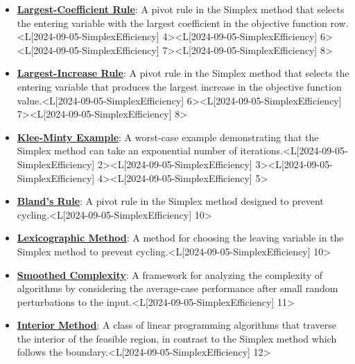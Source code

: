 \documentclass{article}%
\begin{document}
\begin{itemize}[[leftmargin=*]]%
\item \href{https://www.math.purdue.edu/~yipn/421/2024-09-05-SimplexEfficiency.pdf#page=4}{\textbf{Largest{-}Coefficient Rule}}: A pivot rule in the Simplex method that selects the entering variable with the largest coefficient in the objective function row.<L[2024-09-05-SimplexEfficiency] 4><L[2024-09-05-SimplexEfficiency] 6><L[2024-09-05-SimplexEfficiency] 7><L[2024-09-05-SimplexEfficiency] 8>%
\item \href{https://www.math.purdue.edu/~yipn/421/2024-09-05-SimplexEfficiency.pdf#page=6}{\textbf{Largest{-}Increase Rule}}: A pivot rule in the Simplex method that selects the entering variable that produces the largest increase in the objective function value.<L[2024-09-05-SimplexEfficiency] 6><L[2024-09-05-SimplexEfficiency] 7><L[2024-09-05-SimplexEfficiency] 8>%
\item \href{https://www.math.purdue.edu/~yipn/421/2024-09-05-SimplexEfficiency.pdf#page=2}{\textbf{Klee{-}Minty Example}}: A worst-case example demonstrating that the Simplex method can take an exponential number of iterations.<L[2024-09-05-SimplexEfficiency] 2><L[2024-09-05-SimplexEfficiency] 3><L[2024-09-05-SimplexEfficiency] 4><L[2024-09-05-SimplexEfficiency] 5>%
\item \href{https://www.math.purdue.edu/~yipn/421/2024-09-05-SimplexEfficiency.pdf#page=10}{\textbf{Bland's Rule}}: A pivot rule in the Simplex method designed to prevent cycling.<L[2024-09-05-SimplexEfficiency] 10>%
\item \href{https://www.math.purdue.edu/~yipn/421/2024-09-05-SimplexEfficiency.pdf#page=10}{\textbf{Lexicographic Method}}: A method for choosing the leaving variable in the Simplex method to prevent cycling.<L[2024-09-05-SimplexEfficiency] 10>%
\item \href{https://www.math.purdue.edu/~yipn/421/2024-09-05-SimplexEfficiency.pdf#page=11}{\textbf{Smoothed Complexity}}: A framework for analyzing the complexity of algorithms by considering the average-case performance after small random perturbations to the input.<L[2024-09-05-SimplexEfficiency] 11>%
\item \href{https://www.math.purdue.edu/~yipn/421/2024-09-05-SimplexEfficiency.pdf#page=12}{\textbf{Interior Method}}: A class of linear programming algorithms that traverse the interior of the feasible region, in contrast to the Simplex method which follows the boundary.<L[2024-09-05-SimplexEfficiency] 12>%
\end{itemize}%
\end{document}
